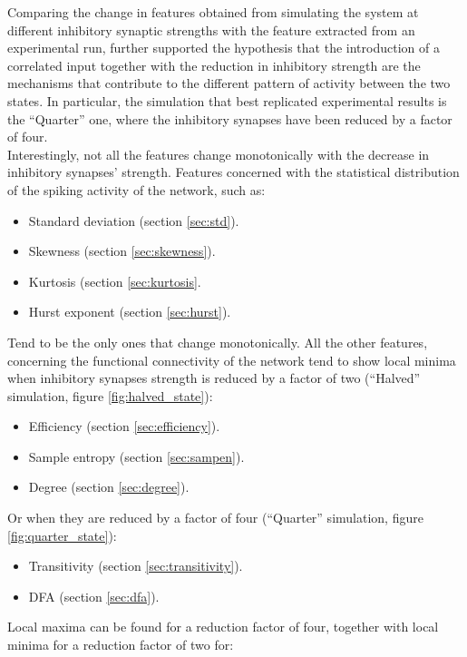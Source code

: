   Comparing the change in features obtained from simulating the system at different inhibitory synaptic strengths with the feature extracted from an experimental run, further supported the hypothesis that the introduction of a correlated input together with the reduction in inhibitory strength are the mechanisms that contribute to the different pattern of activity between the two states.
  In particular, the simulation that best replicated experimental results is the ``Quarter'' one, where the inhibitory synapses have been reduced by a factor of four.\\
  Interestingly, not all the features change monotonically with the decrease in inhibitory synapses' strength.
  Features concerned with the statistical distribution of the spiking activity of the network, such as:

  \begin{itemize}
    \item Standard deviation (section \ref{sec:std}).
    \item Skewness (section \ref{sec:skewness}).
    \item Kurtosis (section \ref{sec:kurtosis}.
    \item Hurst exponent (section \ref{sec:hurst}).
  \end{itemize}

  Tend to be the only ones that change monotonically.
  All the other features, concerning the functional connectivity of the network tend to show local minima when inhibitory synapses strength is reduced by a factor of two (``Halved'' simulation, figure \ref{fig:halved_state}):

  \begin{itemize}
    \item Efficiency (section \ref{sec:efficiency}).
    \item Sample entropy (section \ref{sec:sampen}).
    \item Degree (section \ref{sec:degree}).
  \end{itemize}

  Or when they are reduced by a factor of four (``Quarter'' simulation, figure \ref{fig:quarter_state}):

  \begin{itemize}
    \item Transitivity (section \ref{sec:transitivity}).
    \item DFA (section \ref{sec:dfa}).
  \end{itemize}

  Local maxima can be found for a reduction factor of four, together with local minima for a reduction factor of two for:

